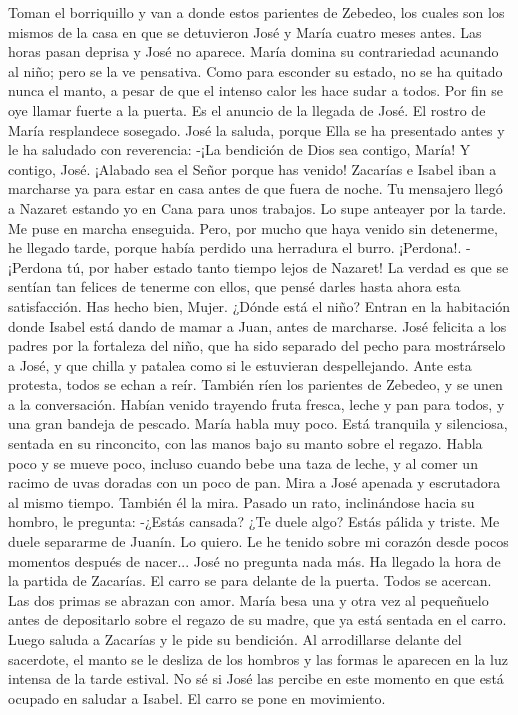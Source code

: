 \documentclass[12pt]{book} %
\begin{document}
Toman el borriquillo y van a donde estos parientes de Zebedeo, los cuales son los mismos de la casa en que se 
detuvieron José y María cuatro meses antes. 
Las horas pasan deprisa y José no aparece. María domina su contrariedad acunando al niño; pero se la ve pensativa. 
Como para esconder su estado, no se ha quitado nunca el manto, a pesar de que el intenso calor les hace sudar a todos. 
Por fin se oye llamar fuerte a la puerta. Es el anuncio de la llegada de José. El rostro de María resplandece sosegado. José la saluda, porque Ella se ha presentado antes y le ha saludado con reverencia: 
-¡La bendición de Dios sea contigo, María! 
Y contigo, José. ¡Alabado sea el Señor porque has venido! Zacarías e Isabel iban a marcharse ya para estar en casa 
antes de que fuera de noche. 
Tu mensajero llegó a Nazaret estando yo en Cana para unos trabajos. Lo supe anteayer por la tarde. Me puse en marcha enseguida. Pero, por mucho que haya venido sin detenerme, he llegado tarde, porque había perdido una herradura el burro. ¡Perdona!. 
-¡Perdona tú, por haber estado tanto tiempo lejos de Nazaret! La verdad es que se sentían tan felices de tenerme con 
ellos, que pensé darles hasta ahora esta satisfacción. 
Has hecho bien, Mujer. ¿Dónde está el niño? 
Entran en la habitación donde Isabel está dando de mamar a Juan, antes de marcharse. José felicita a los padres por la fortaleza del niño, que ha sido separado del pecho para mostrárselo a José, y que chilla y patalea como si le estuvieran despellejando. Ante esta protesta, todos se echan a reír. También ríen los parientes de Zebedeo, y se unen a la conversación. Habían venido trayendo fruta fresca, leche y pan para todos, y una gran bandeja de pescado. 
María habla muy poco. Está tranquila y silenciosa, sentada en su rinconcito, con las manos bajo su manto sobre el regazo. Habla poco y se mueve poco, incluso cuando bebe una taza de leche, y al comer un racimo de uvas doradas con un poco de pan. Mira a José apenada y escrutadora al mismo tiempo. 
También él la mira. Pasado un rato, inclinándose hacia su hombro, le pregunta: 
-¿Estás cansada? ¿Te duele algo? Estás pálida y triste. 
Me duele separarme de Juanín. Lo quiero. Le he tenido sobre mi corazón desde pocos momentos después de nacer... José no pregunta nada más. 
Ha llegado la hora de la partida de Zacarías. El carro se para delante de la puerta. Todos se acercan. Las dos primas se abrazan con amor. María besa una y otra vez al pequeñuelo antes de depositarlo sobre el regazo de su madre, que ya está sentada en el carro. Luego saluda a Zacarías y le pide su bendición. Al arrodillarse delante del sacerdote, el manto se le desliza de los hombros y las formas le aparecen en la luz intensa de la tarde estival. No sé si José las percibe en este momento en que está ocupado en saludar a Isabel. El carro se pone en movimiento. 
\end{document}
